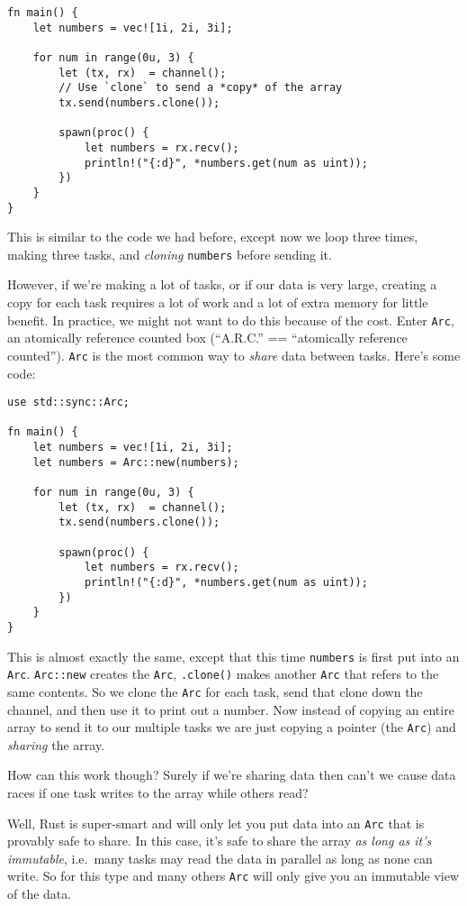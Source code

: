 \documentclass[]{article}
\begin{document}
\begin{verbatim}
fn main() {
    let numbers = vec![1i, 2i, 3i];

    for num in range(0u, 3) {
        let (tx, rx)  = channel();
        // Use `clone` to send a *copy* of the array
        tx.send(numbers.clone());

        spawn(proc() {
            let numbers = rx.recv();
            println!("{:d}", *numbers.get(num as uint));
        })
    }
}
\end{verbatim}

This is similar to the code we had before, except now we loop three
times, making three tasks, and \emph{cloning} \texttt{numbers} before
sending it.

However, if we're making a lot of tasks, or if our data is very large,
creating a copy for each task requires a lot of work and a lot of extra
memory for little benefit. In practice, we might not want to do this
because of the cost. Enter \texttt{Arc}, an atomically reference counted
box (``A.R.C.'' == ``atomically reference counted''). \texttt{Arc} is
the most common way to \emph{share} data between tasks. Here's some
code:

\begin{verbatim}
use std::sync::Arc;

fn main() {
    let numbers = vec![1i, 2i, 3i];
    let numbers = Arc::new(numbers);

    for num in range(0u, 3) {
        let (tx, rx)  = channel();
        tx.send(numbers.clone());

        spawn(proc() {
            let numbers = rx.recv();
            println!("{:d}", *numbers.get(num as uint));
        })
    }
}
\end{verbatim}

This is almost exactly the same, except that this time \texttt{numbers}
is first put into an \texttt{Arc}. \texttt{Arc::new} creates the
\texttt{Arc}, \texttt{.clone()} makes another \texttt{Arc} that refers
to the same contents. So we clone the \texttt{Arc} for each task, send
that clone down the channel, and then use it to print out a number. Now
instead of copying an entire array to send it to our multiple tasks we
are just copying a pointer (the \texttt{Arc}) and \emph{sharing} the
array.

How can this work though? Surely if we're sharing data then can't we
cause data races if one task writes to the array while others read?

Well, Rust is super-smart and will only let you put data into an
\texttt{Arc} that is provably safe to share. In this case, it's safe to
share the array \emph{as long as it's immutable}, i.e.~many tasks may
read the data in parallel as long as none can write. So for this type
and many others \texttt{Arc} will only give you an immutable view of the
data.
\end{document}
